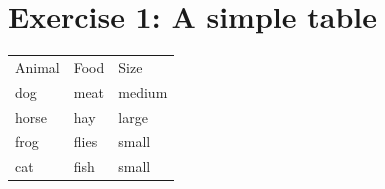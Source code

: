 \documentclass{article}
\begin{document}
\section*{Exercise 1: A simple table}

\begin{tabular}{lll}
Animal & Food & Size \\
dog & meat & medium \\
horse & hay & large \\
frog & flies & small \\
cat & fish & small \\
\end{tabular}
\end{document}
